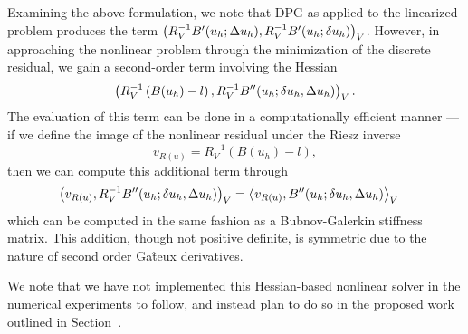 Examining the above formulation, we note that DPG as applied to the linearized problem produces the term $ \LRp{R_V^{-1}B'(u_h;\Delta u_h), R_V^{-1}B'(u_h;\delta u_h)}_V$. However, in approaching the nonlinear problem through the minimization of the discrete residual, we gain a second-order term involving the Hessian
\[
\LRp{R_V^{-1}\left(B(u_h)-l\right),R_V^{-1}B''(u_h;\delta u_h,\Delta u_h)}_V.
\] 
The evaluation of this term can be done in a computationally efficient manner --- if we define the image of the nonlinear residual under the Riesz inverse
\[
v_{R(u)} = R_V^{-1}\left(B(u_h)-l\right),
\]
then we can compute this additional term through
\begin{align*}
\LRp{v_{R(u)},R_V^{-1}B''(u_h;\delta u_h,\Delta u_h)}_V &= \LRa{v_{R(u)},B''(u_h;\delta u_h,\Delta u_h)}_V
\end{align*}
which can be computed in the same fashion as a Bubnov-Galerkin stiffness matrix. This addition, though not positive definite, is symmetric due to the nature of second order Ga\^teux derivatives. 

We note that we have not implemented this Hessian-based nonlinear solver in the numerical experiments to follow, and instead plan to do so in the proposed work outlined in Section~.

